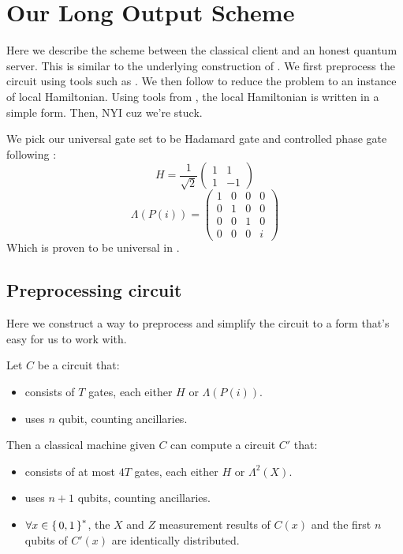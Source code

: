 \section{Our Long Output Scheme}

Here we describe the scheme between the classical client and an honest quantum server. This is similar to the underlying construction of \cite{mahadev_delegation}. We first preprocess the circuit using tools such as \cite{quant-ph/0301040}. We then follow \cite{kitaev2002classical} to reduce the problem to an instance of local Hamiltonian. Using tools from \cite{PhysRevA.93.022326}, the local Hamiltonian is written in a simple form. Then, NYI cuz we're stuck. 

We pick our universal gate set to be Hadamard gate and controlled phase gate following \cite{quant-ph/0301040}:
$$H=\frac{1}{\sqrt{2}}\begin{pmatrix}1&1\\1&-1\end{pmatrix}$$
$$\Lambda(P(i))=\begin{pmatrix}1&0&0&0\\0&1&0&0\\0&0&1&0\\0&0&0&i\end{pmatrix}$$
Which is proven to be universal in \cite{kitaev_1997}.

\subsection{Preprocessing circuit}

Here we construct a way to preprocess and simplify the circuit to a form that's easy for us to work with.


\begin{theorem}
	Let $C$ be a circuit that:
	\begin{itemize}
		\item consists of $T$ gates, each either $H$ or $\Lambda(P(i))$.
		\item uses $n$ qubit, counting ancillaries.
	\end{itemize}
	Then a classical machine given $C$ can compute a circuit $C'$ that:
	\begin{itemize}
		\item consists of at most $4T$ gates, each either $H$ or $\Lambda^2(X)$.
		\item uses $n+1$ qubits, counting ancillaries.
		\item $\forall x\in\set{0,1}^*$, the $X$ and $Z$ measurement results of $C(x)$ and the first $n$ qubits of $C'(x)$ are identically distributed.
	\end{itemize}
\end{theorem}

